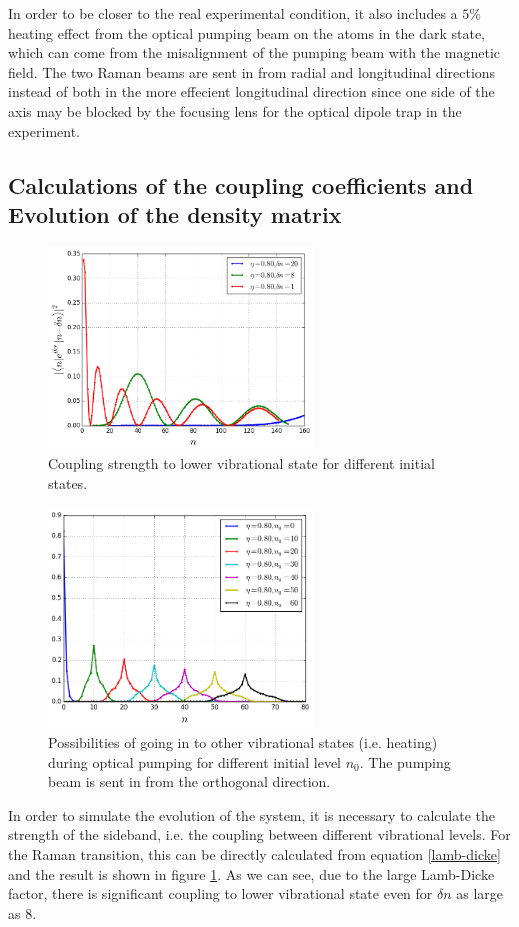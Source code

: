 \documentclass[aps,twocolumn,secnumarabic,balancelastpage,amsmath,amssymb,nofootinbib]{revtex4}
\begin{document}
In order to be closer to the real experimental condition, it also includes a $5\%$ heating effect from the optical pumping beam on the atoms in the dark state, which can come from the misalignment of the pumping beam with the magnetic field. The two Raman beams are sent in from radial and longitudinal directions instead of both in the more effecient longitudinal direction since one side of the axis may be blocked by the focusing lens for the optical dipole trap in the experiment.

\subsection{Calculations of the coupling coefficients and Evolution of the density matrix}
\begin{figure}
  \begin{center}
    \includegraphics[width=7cm]{../raman_0.8_1.png}
  \end{center}
  \caption{Coupling strength to lower vibrational state for different initial states.}
  \label{fig-raman-curve}
\end{figure}
\begin{figure}
  \begin{center}
    \includegraphics[width=7cm]{../pump_0.8_0_curve.png}
  \end{center}
  \caption{Possibilities of going in to other vibrational states (i.e. heating) during optical pumping for different initial level $n_0$. The pumping beam is sent in from the orthogonal direction.}
  \label{fig-pump-curve}
\end{figure}
In order to simulate the evolution of the system, it is necessary to calculate the strength of the sideband, i.e. the coupling between different vibrational levels. For the Raman transition, this can be directly calculated from equation \ref{lamb-dicke} and the result is shown in figure \ref{fig-raman-curve}. As we can see, due to the large Lamb-Dicke factor, there is significant coupling to lower vibrational state even for $\delta n$ as large as $8$.\\
\end{document}
